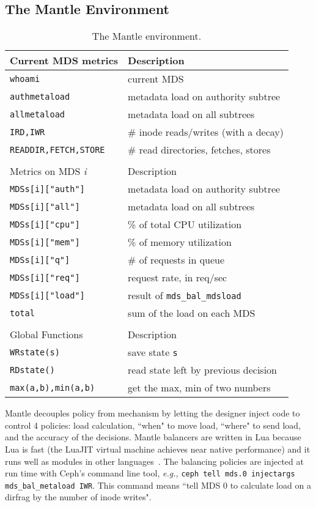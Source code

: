 \subsection{The Mantle Environment}
\label{the-mantle-environment}
\begin{table}[tb]
	\centering
	\ssp
	\begin{tabular}{ >{}p{4cm} | >{}p{10cm}}
    	\centering Current MDS metrics
		& \centering Description
		\tabularnewline\hline	
		\small\texttt{whoami}
		& current MDS 
		\tabularnewline
		\small\texttt{authmetaload}
		& metadata load on authority subtree
		\tabularnewline	        
		\small\texttt{allmetaload}
		& metadata load on all subtrees
		\tabularnewline	     
		\small\texttt{IRD,IWR}
		& \# inode reads/writes (with a decay)
		\tabularnewline
		\small\texttt{READDIR,FETCH,STORE}
		& \# read directories, fetches, stores
		\tabularnewline	                
        \multicolumn{2}{c}{}
        \tabularnewline
       
		\centering Metrics on MDS {\it i}
		& \centering Description
		\tabularnewline\hline       
		\small\texttt{MDSs[i]["auth"]}	
		& metadata load on authority subtree
		\tabularnewline			
		\small\texttt{MDSs[i]["all"]}	
		& metadata load on all subtrees
		\tabularnewline	        
		\small\texttt{MDSs[i]["cpu"]}
		& \% of total CPU utilization
		\tabularnewline	
		\small\texttt{MDSs[i]["mem"]}	
		& \% of memory utilization
		\tabularnewline	
		\small\texttt{MDSs[i]["q"]}	
		& \# of requests in queue
		\tabularnewline
		\small\texttt{MDSs[i]["req"]}	
		& request rate, in req/sec
		\tabularnewline				
		\small\texttt{MDSs[i]["load"]}	
		& result of \texttt{mds\_bal\_mdsload}
        \tabularnewline
		\small\texttt{total}
		& sum of the load on each MDS        
        \tabularnewline
        \multicolumn{2}{c}{}
        \tabularnewline
        
		\centering Global Functions
		& \centering Description
		\tabularnewline\hline	 
		\small\texttt{WRstate(s)}
		& save state \texttt{s}
        \tabularnewline
        \small\texttt{RDstate()}	
		& read state left by previous decision
        \tabularnewline
        \small\texttt{max(a,b),min(a,b)}
        & get the max, min of two numbers
	\end{tabular}
	\dsp
	\caption{The Mantle environment.\label{table:metrics}}    
\end{table}
Mantle decouples policy from mechanism by letting the designer inject code to control 4 policies: load calculation, ``when" to move load, ``where" to send load, and the accuracy of the decisions. Mantle balancers are written in Lua because Lua is fast (the LuaJIT virtual machine achieves near native performance) and it runs well as modules in other languages~\cite{grawinkel:pdsw2012-lua}. The balancing policies are injected at run time with Ceph's command line tool, {\it e.g.,} \texttt{\small ceph tell mds.0 injectargs mds\_bal\_metaload IWR}. This command means ``tell MDS 0 to calculate load on a dirfrag by the number of inode writes".

